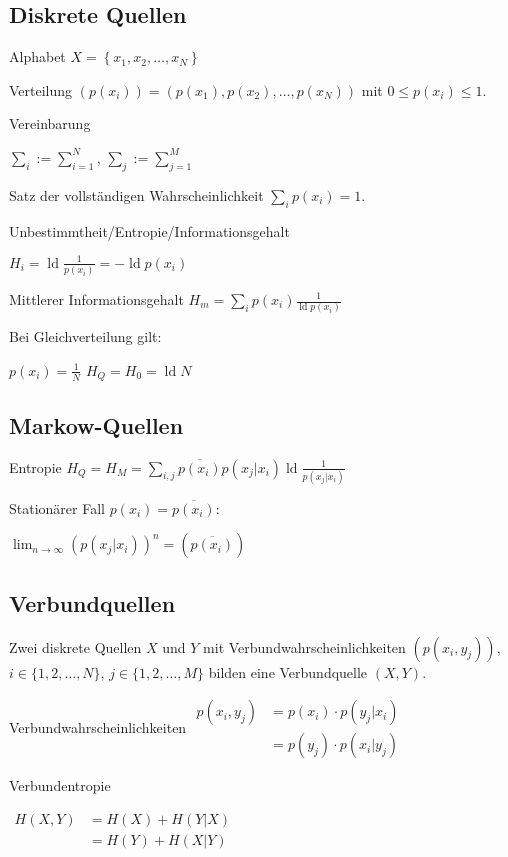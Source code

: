 \documentclass[8pt,a4paper,landscape]{extarticle}
\DeclareMathOperator*{\ld}{ld}
\begin{document}
\begin{multicols*}{6}
\RaggedRight
\section{Diskrete Quellen}
Alphabet $X = \left\lbrace x_1, x_2, \dots , x_N\right\rbrace$

Verteilung $(p(x_i)) = (p(x_1), p(x_2), \dots, p(x_N))$ mit $0 \leq p(x_i) \leq 1$.

Vereinbarung

$\displaystyle \sum_i := \sum_{i=1}^N$, $\displaystyle \sum_j := \sum_{j=1}^M$

Satz der vollständigen Wahr\-schein\-lich\-keit $\sum_i p(x_i) = 1$.

Unbestimmtheit/Ent\-ropie/Infor\-ma\-tions\-ge\-halt

$\boxed{H_i = \ld \frac{1}{p(x_i)}} = -\ld p(x_i)$

Mittlerer Informationsgehalt $\boxed{H_m = \sum_i p(x_i) \frac{1}{\ld p(x_i)}}$

Bei Gleichverteilung gilt:

$p(x_i) = \frac{1}{N}$ $H_Q = H_0 = \ld N$

\subsection{Markow-Quellen}
Entropie $H_Q = H_M = \boxed{\sum_{i,j} \overline{p(x_i)} p(x_j | x_i) \ld \frac{1}{p(x_j | x_i)}}$

Stationärer Fall $p(x_i) = \overline{p(x_i)}$:

$\lim_{n \rightarrow \infty} (p(x_j | x_i))^n  = (\overline{p(x_i)})$

\subsection{Verbundquellen}
Zwei diskrete Quellen $X$ und $Y$ mit Verbundwahrscheinlichkeiten $(p(x_i, y_j))$, $i \in \lbrace1, 2, \dots, N\rbrace$, $j \in \lbrace1, 2, \dots, M\rbrace$ bilden eine Verbundquelle $(X, Y)$.

Verbundwahrscheinlichkeiten
$\boxed{\begin{aligned}
	p(x_i, y_j)	&= p(x_i) \cdot p(y_j|x_i) \\
			&= p(y_j) \cdot p(x_i|y_j)
\end{aligned}}$

Verbundentropie

$\begin{aligned}
	H(X, Y)	&= H(X) + H(Y|X) \\
		&= H(Y) + H(X|Y)
\end{aligned}$


\end{multicols*}
\end{document}
